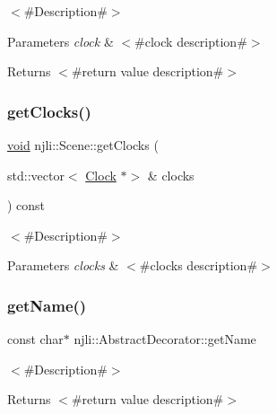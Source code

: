$<$\#\+Description\#$>$


\begin{DoxyParams}{Parameters}
{\em clock} & $<$\#clock description\#$>$\\
\hline
\end{DoxyParams}
\begin{DoxyReturn}{Returns}
$<$\#return value description\#$>$ 
\end{DoxyReturn}
\mbox{\label{classnjli_1_1_scene_a3a97afacd1d6a151b0405788ed5b8b63}} 
\subsubsection{\texorpdfstring{get\+Clocks()}{getClocks()}}
{\footnotesize\ttfamily \mbox{\hyperlink{_thread_8h_af1e856da2e658414cb2456cb6f7ebc66}{void}} njli\+::\+Scene\+::get\+Clocks (\begin{DoxyParamCaption}\item[{std\+::vector$<$ \mbox{\hyperlink{classnjli_1_1_clock}{Clock}} $\ast$$>$ \&}]{clocks }\end{DoxyParamCaption}) const}

$<$\#\+Description\#$>$


\begin{DoxyParams}{Parameters}
{\em clocks} & $<$\#clocks description\#$>$ \\
\hline
\end{DoxyParams}
\mbox{\label{classnjli_1_1_scene_ad41266885be835f3ee602311e20877a4}} 
\subsubsection{\texorpdfstring{get\+Name()}{getName()}}
{\footnotesize\ttfamily const char$\ast$ njli\+::\+Abstract\+Decorator\+::get\+Name}

$<$\#\+Description\#$>$

\begin{DoxyReturn}{Returns}
$<$\#return value description\#$>$ 
\end{DoxyReturn}
\mbox{\label{classnjli_1_1_scene_aacdcd2433fadc469c85c16ea50f9123d}} 
